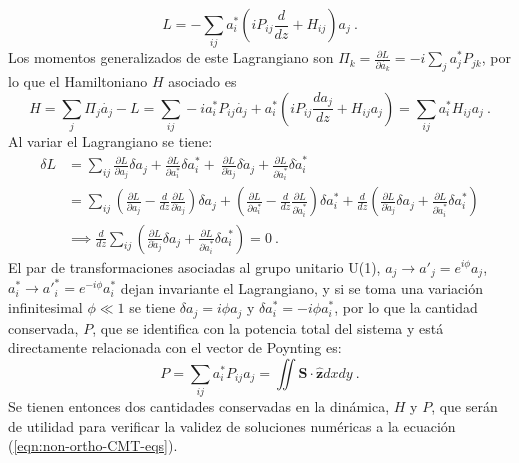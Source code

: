 \begin{equation}
	L = -\sum_{ij}  a_i^*\left(i  P_{ij} \frac{d }{dz} + H_{ij}  \right)a_j \ .
\end{equation}
Los momentos generalizados de este Lagrangiano son $\Pi_k=\frac{\partial L}{\partial \dot{a_k}} = -i\sum_{j} a_j^* P_{jk}$, por lo que el Hamiltoniano $H$ asociado es
\begin{equation}
H = \sum_{j} \Pi_j \dot{a_j} - L = \sum_{ij} -ia_i^* P_{ij} \dot{a_j} + a_i^*\left(i  P_{ij} \frac{d a_j}{dz} + H_{ij} a_j \right) = \sum_{ij} a_i^* H_{ij} a_j \ .
\end{equation}
Al variar el Lagrangiano se tiene:
\begin{align*}
	\delta L &= \sum_{ij} \frac{\partial L}{\partial a_j} \delta a_{j} +  \frac{\partial L}{\partial {a}_{i}^*} \delta {a}_{i}^* + \ \frac{\partial L}{\partial \dot{a}_{j}} \delta \dot{a}_{j} + \frac{\partial L}{\partial \dot{{a}}_{i}^*} \delta \dot{{a}}_{i}^*
	\\
	&= \sum_{ij} \left( \frac{\partial L}{\partial a_{j}} - \frac{d}{dz}\frac{\partial L}{\partial \dot{a}_{j}} \right)\delta a_{j} + \left( \frac{\partial L}{\partial {a}_{i}^*} - \frac{d}{dz}\frac{\partial L}{\partial  \dot{{a}}_{i}^*} \right)\delta {a}_{i}^* + \frac{d}{dz}\left(\frac{\partial L}{\partial \dot{a}_{j}}\delta a_{j} +  \frac{\partial L}{\partial \dot{{a}}^*_{i}}\delta {a}_{i}^*\right)
	\\	
	&\implies  \frac{d}{dz} \sum_{ij}\left(\frac{\partial L}{\partial \dot{a}_{j}}\delta a_{j} +  \frac{\partial L}{\partial \dot{{a}}_{i}^*}\delta {a}_{i}^*\right) = 0 \ .
\end{align*}
El par de transformaciones asociadas al grupo unitario U(1), $a_j\to a'_j = e^{i\phi}a_j$, ${a}_i^* \to {a'}_i^* = e^{-i\phi}{a}_i^*$ dejan invariante el Lagrangiano, y si se toma una variación infinitesimal $\phi \ll 1$ se tiene $\delta a_j = i\phi a_j$ y $\delta {a}_i^* = -i\phi {a}_i^*$, por lo que la cantidad conservada, $P$, que se identifica con la potencia total del sistema y está directamente relacionada con el vector de Poynting es:
\begin{equation}
	P = \sum_{ij} a_i^* P_{ij} a_j = \iint \textbf{S} \cdot \hat{\textbf{z}} dxdy \ .  \label{eqn:power}
\end{equation}
Se tienen entonces dos cantidades conservadas en la dinámica, $H$ y $P$, que serán de utilidad para verificar la validez de soluciones numéricas a la ecuación (\ref{eqn:non-ortho-CMT-eqs}).

